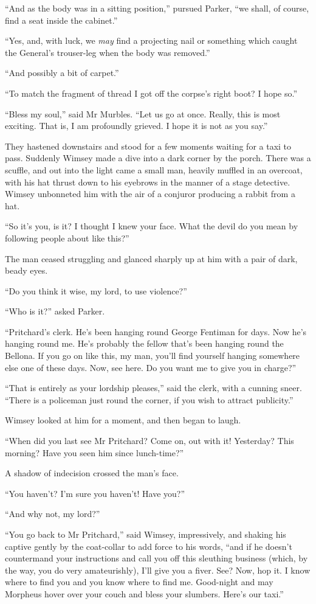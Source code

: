 \enquote{And as the body was in a sitting position,} pursued Parker, \enquote{we shall, of course, find a seat inside the cabinet.}

\enquote{Yes, and, with luck, we \textit{may} find a projecting nail or something which caught the General's trouser-leg when the body was removed.}

\enquote{And possibly a bit of carpet.}

\enquote{To match the fragment of thread I got off the corpse's right boot? I hope so.}

\enquote{Bless my soul,} said Mr Murbles. \enquote{Let us go at once. Really, this is most exciting. That is, I am profoundly grieved. I hope it is not as you say.}

They hastened downstairs and stood for a few moments waiting for a taxi to pass. Suddenly Wimsey made a dive into a dark corner by the porch. There was a scuffle, and out into the light came a small man, heavily muffled in an overcoat, with his hat thrust down to his eyebrows in the manner of a stage detective. Wimsey unbonneted him with the air of a conjuror producing a rabbit from a hat.

\enquote{So it's you, is it? I thought I knew your face. What the devil do you mean by following people about like this?}

The man ceased struggling and glanced sharply up at him with a pair of dark, beady eyes.

\enquote{Do you think it wise, my lord, to use violence?}

\enquote{Who is it?} asked Parker.

\enquote{Pritchard's clerk. He's been hanging round George Fentiman for days. Now he's hanging round me. He's probably the fellow that's been hanging round the Bellona. If you go on like this, my man, you'll find yourself hanging somewhere else one of these days. Now, see here. Do you want me to give you in charge?}

\enquote{That is entirely as your lordship pleases,} said the clerk, with a cunning sneer. \enquote{There is a policeman just round the corner, if you wish to attract publicity.}

Wimsey looked at him for a moment, and then began to laugh.

\enquote{When did you last see Mr Pritchard? Come on, out with it! Yesterday? This morning? Have you seen him since lunch-time?}

A shadow of indecision crossed the man's face.

\enquote{You haven't? I'm sure you haven't! Have you?}

\enquote{And why not, my lord?}

\enquote{You go back to Mr Pritchard,} said Wimsey, impressively, and shaking his captive gently by the coat-collar to add force to his words, \enquote{and if he doesn't countermand your instructions and call you off this sleuthing business (which, by the way, you do very amateurishly), I'll give you a fiver. See? Now, hop it. I know where to find you and you know where to find me. Good-night and may Morpheus hover over your couch and bless your slumbers. Here's our taxi.}

